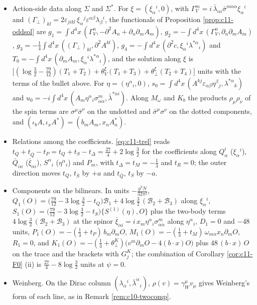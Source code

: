 \begin{remark}
\begin{itemize}
\item Action-side data along $\Sigma$ and $\Sigma^*$. For $\xi=(\xi_\alpha{}^i,0)$, with $\Gamma_V^m=i\,\bar\lambda_{\dot\alpha i}\bar\sigma^{m\dot\alpha\alpha}\xi_\alpha{}^i$ and $(\Gamma_\perp)_{kl}=2\varepsilon_{jikl}\,\xi_\alpha{}^j\varepsilon^{\alpha\beta}\lambda_\beta{}^i$, the functionals of Proposition \ref{prop:c11-oddsol} are $g_1=\int d^4x\,(\Gamma_V^n,-\partial^2A_n+\partial_n\partial_mA_m)$, $g_2=-\int d^4x\,(\Gamma_V^n,\partial_n\partial_mA_m)$, $g_3=-\tfrac14\int d^4x\,((\Gamma_\perp)_{kl},\partial^2A^{kl})$, $g_4=-\int d^4x\,(\partial^2c,\xi_\alpha{}^i\lambda^{*\alpha}{}_i)$ and $T_0=-\int d^4x\,(\partial_mA_m,\xi_\alpha{}^i\lambda^{*\alpha}{}_i)$, and the solution along $\xi$ is $\big[(\log\tfrac32-\tfrac{79}{12})(T_1+T_2)+\theta^\xi_V(T_1+T_3)+\theta^\xi_\perp(T_2+T_4)\big]$ units with the terms of the bullet above. For $\eta=(\eta^\alpha{}_i,0)$, $s_0=\int d^4x\,(A^{kj}\varepsilon_{\alpha\beta}\eta^\beta{}_j,\lambda^{*\alpha}{}_k)$ and $u_0=-i\int d^4x\,(A_m\eta^\alpha{}_i\sigma^m_{\alpha\dot\alpha},\bar\lambda^{*\dot\alpha i})$. Along $M_\omega$ and $K_b$ the products $\rho_\mu\rho_\nu$ of the spin terms are $\sigma^\mu\bar\sigma^\nu$ on the undotted and $\bar\sigma^\mu\sigma^\nu$ on the dotted components, and $(\iota_bA,\iota_xA^*)=(b_mA_m,x_nA^*_n)$.
\item Relations among the coefficients. \eqref{eq:c11-trel} reads $t_{Q}+t_{\bar Q}-t_P=t_Q+t_{S}-t_\Delta=\tfrac{27}4+2\log\tfrac32$ for the coefficients along $Q^i_\alpha$ ($\xi_\alpha{}^i$), $\bar Q_{\dot\alpha i}$ ($\bar\xi_{\dot\alpha i}$), $S^\alpha{}_i$ ($\eta^\alpha{}_i$) and $P_m$, with $t_\Delta=t_M=-\tfrac13$ and $t_R=0$; the outer direction moves $t_Q$, $t_{\bar S}$ by $+a$ and $t_{\bar Q}$, $t_S$ by $-a$.
\item Components on the bilinears. In units $-\frac{g^2N}{32\pi^2}$, $Q_1(O)=\big(\tfrac{79}{12}-3\log\tfrac32-t_Q\big)\mathcal B_1+4\log\tfrac32\,(\mathcal B_2+\mathcal B_3)$ along $\xi_\alpha{}^i$, $S_1(O)=\big(\tfrac{79}{12}-3\log\tfrac32-t_S\big)\{S^{(1)}(\eta),O\}$ plus the two-body terms $4\log\tfrac32\,(\mathcal B_2+\mathcal B_3)$ at the spinor $\bar\xi_{\dot\alpha i}=i\,x_m\eta^\alpha{}_i\sigma^m_{\alpha\dot\alpha}$ along $\eta^\alpha{}_i$, $D_1=0$ and $-48$ units, $P_1(O)=-(\tfrac13+t_P)\,b_m\partial_mO$, $M_1(O)=-(\tfrac13+t_M)\,\omega_{mn}x_n\partial_mO$, $R_1=0$, and $K_1(O)=-(\tfrac13+\theta^K_\perp)\big(v^m\partial_mO-4(b\cdot x)O\big)$ plus $48\,(b\cdot x)\,O$ on the trace and the brackets with $G^K_j$; the combination of Corollary \ref{cor:c11-F0} (ii) is $\tfrac{27}4-8\log\tfrac32$ units at $\psi=0$.
\item Weinberg. On the Dirac column $(\lambda_\alpha{}^i,\bar\lambda^{\dot\alpha}{}_i)$, $\rho(v)=\gamma_W^\mu v_\mu$ gives Weinberg's form of each line, as in Remark \ref{rem:c10-twocomp}.
\end{itemize}
\end{remark}
